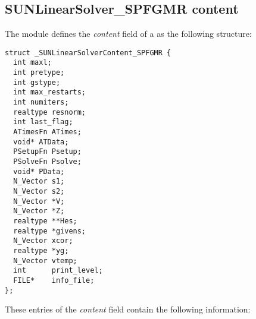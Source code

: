 \subsection{SUNLinearSolver\_SPFGMR content}
\label{ss:sunlinsol_spfgmr_content}

The {\sunlinsolspfgmr} module defines the \textit{content} field of a
 as the following structure:
\begin{verbatim}
struct _SUNLinearSolverContent_SPFGMR {
  int maxl;
  int pretype;
  int gstype;
  int max_restarts;
  int numiters;
  realtype resnorm;
  int last_flag;
  ATimesFn ATimes;
  void* ATData;
  PSetupFn Psetup;
  PSolveFn Psolve;
  void* PData;
  N_Vector s1;
  N_Vector s2;
  N_Vector *V;
  N_Vector *Z;
  realtype **Hes;
  realtype *givens;
  N_Vector xcor;
  realtype *yg;
  N_Vector vtemp;
  int      print_level;
  FILE*    info_file;
};
\end{verbatim}
These entries of the \emph{content} field contain the following
information:
